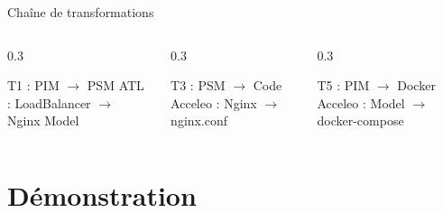 \documentclass[aspectratio=169,12pt]{beamer}
\begin{document}
\begin{frame}[fragile]{Chaîne de transformations}
\vspace{0.5em}
\begin{columns}
\begin{column}{0.3\textwidth}
\begin{block}{\footnotesize T1 : PIM $\rightarrow$ PSM}
\footnotesize ATL : LoadBalancer $\rightarrow$ Nginx Model
\end{block}
\end{column}
\begin{column}{0.3\textwidth}
\begin{block}{\footnotesize T3 : PSM $\rightarrow$ Code}
\footnotesize Acceleo : Nginx $\rightarrow$ nginx.conf
\end{block}
\end{column}
\begin{column}{0.3\textwidth}
\begin{block}{\footnotesize T5 : PIM $\rightarrow$ Docker}
\footnotesize Acceleo : Model $\rightarrow$ docker-compose
\end{block}
\end{column}
\end{columns}
\end{frame}

\section{Démonstration}
\end{document}
